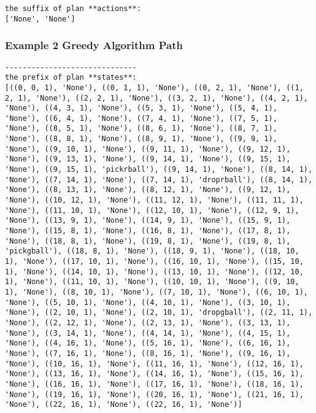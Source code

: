 \begin{lstlisting}
the suffix of plan **actions**:
['None', 'None']
\end{lstlisting}

\subsubsection{Example 2 Greedy Algorithm Path}
\begin{lstlisting}
------------------------------
the prefix of plan **states**:
[((0, 0, 1), 'None'), ((0, 1, 1), 'None'), ((0, 2, 1), 'None'), ((1, 2, 1), 'None'), ((2, 2, 1), 'None'), ((3, 2, 1), 'None'), ((4, 2, 1), 'None'), ((4, 3, 1), 'None'), ((5, 3, 1), 'None'), ((5, 4, 1), 'None'), ((6, 4, 1), 'None'), ((7, 4, 1), 'None'), ((7, 5, 1), 'None'), ((8, 5, 1), 'None'), ((8, 6, 1), 'None'), ((8, 7, 1), 'None'), ((8, 8, 1), 'None'), ((8, 9, 1), 'None'), ((9, 9, 1), 'None'), ((9, 10, 1), 'None'), ((9, 11, 1), 'None'), ((9, 12, 1), 'None'), ((9, 13, 1), 'None'), ((9, 14, 1), 'None'), ((9, 15, 1), 'None'), ((9, 15, 1), 'pickrball'), ((9, 14, 1), 'None'), ((8, 14, 1), 'None'), ((7, 14, 1), 'None'), ((7, 14, 1), 'droprball'), ((8, 14, 1), 'None'), ((8, 13, 1), 'None'), ((8, 12, 1), 'None'), ((9, 12, 1), 'None'), ((10, 12, 1), 'None'), ((11, 12, 1), 'None'), ((11, 11, 1), 'None'), ((11, 10, 1), 'None'), ((12, 10, 1), 'None'), ((12, 9, 1), 'None'), ((13, 9, 1), 'None'), ((14, 9, 1), 'None'), ((15, 9, 1), 'None'), ((15, 8, 1), 'None'), ((16, 8, 1), 'None'), ((17, 8, 1), 'None'), ((18, 8, 1), 'None'), ((19, 8, 1), 'None'), ((19, 8, 1), 'pickgball'), ((18, 8, 1), 'None'), ((18, 9, 1), 'None'), ((18, 10, 1), 'None'), ((17, 10, 1), 'None'), ((16, 10, 1), 'None'), ((15, 10, 1), 'None'), ((14, 10, 1), 'None'), ((13, 10, 1), 'None'), ((12, 10, 1), 'None'), ((11, 10, 1), 'None'), ((10, 10, 1), 'None'), ((9, 10, 1), 'None'), ((8, 10, 1), 'None'), ((7, 10, 1), 'None'), ((6, 10, 1), 'None'), ((5, 10, 1), 'None'), ((4, 10, 1), 'None'), ((3, 10, 1), 'None'), ((2, 10, 1), 'None'), ((2, 10, 1), 'dropgball'), ((2, 11, 1), 'None'), ((2, 12, 1), 'None'), ((2, 13, 1), 'None'), ((3, 13, 1), 'None'), ((3, 14, 1), 'None'), ((4, 14, 1), 'None'), ((4, 15, 1), 'None'), ((4, 16, 1), 'None'), ((5, 16, 1), 'None'), ((6, 16, 1), 'None'), ((7, 16, 1), 'None'), ((8, 16, 1), 'None'), ((9, 16, 1), 'None'), ((10, 16, 1), 'None'), ((11, 16, 1), 'None'), ((12, 16, 1), 'None'), ((13, 16, 1), 'None'), ((14, 16, 1), 'None'), ((15, 16, 1), 'None'), ((16, 16, 1), 'None'), ((17, 16, 1), 'None'), ((18, 16, 1), 'None'), ((19, 16, 1), 'None'), ((20, 16, 1), 'None'), ((21, 16, 1), 'None'), ((22, 16, 1), 'None'), ((22, 16, 1), 'None')]

\end{lstlisting}
